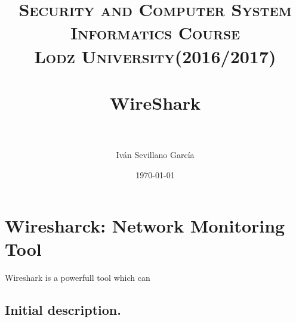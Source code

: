  
 
 \title{	
 	\normalfont \normalsize 
 	\textsc{{\bf Security and Computer System} \\ Informatics Course \\ Lodz University(2016/2017)} \\ [25pt] %
 	\horrule{0.5pt} \\[0.4cm] %
 	\huge WireShark \\ %
 	\horrule{2pt} \\[0.5cm] %
 }
 
 \author{Iván Sevillano García} %
 
 \date{\normalsize\today} %
 
 
 	
 	\maketitle %
 	
 	\newpage %
 	
 	\section{Wiresharck: Network Monitoring Tool}
 	
 	Wireshark is a powerfull tool which can 
 	
 	\subsection{Initial description.}
 	
 